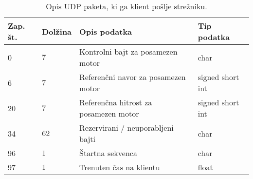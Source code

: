 
\begin{table}[h]
	\centering
	\begin{footnotesize}
		\begin{tabular}{|l l l l|}
		\hline
		Zap. \v{s}t. &  Dol\v{z}ina & Opis podatka & Tip podatka\\ \hline
		0 & $7$ & Kontrolni bajt za posamezen motor & char \\
		6 & $7$ & Referen\v{c}ni navor za posamezen motor & signed short int \\
		20 & $7$ & Referen\v{c}na hitrost za posamezen motor & signed short int \\
		34 &$62$ & Rezervirani / neuporabljeni bajti & char \\
		96 & $1$ & \v{S}tartna sekvenca & char\\
		97 & $1$ & Trenuten \v{c}as na klientu & float\\ \hline
		\end{tabular}
	\end{footnotesize}
	\caption{Opis UDP paketa, ki ga klient po\v{s}lje stre\v{z}niku.}
	\label{table:udp-command}
\end{table}